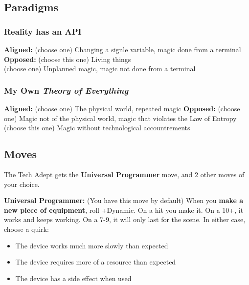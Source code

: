 \documentclass[
  oneside,
  statementpaper,
  9pt]{memoir}
\begin{document}
\hypertarget{paradigms-6}{%
\subsection{Paradigms}\label{paradigms-6}}

\hypertarget{reality-has-an-api}{%
\subsubsection{Reality has an API}\label{reality-has-an-api}}

\textbf{Aligned:} (choose one) Changing a signle variable, magic done
from a terminal\\
\textbf{Opposed:} (choose this one) Living things\\
(choose one) Unplanned magic, magic not done from a terminal

\hypertarget{my-own-theory-of-everything}{%
\subsubsection{\texorpdfstring{My Own \emph{Theory of
Everything}}{My Own Theory of Everything}}\label{my-own-theory-of-everything}}

\textbf{Aligned:} (choose one) The physical world, repeated magic
\textbf{Opposed:} (choose one) Magic not of the physical world, magic
that violates the Law of Entropy\\
(choose this one) Magic without technological accountrements

\hypertarget{moves-6}{%
\subsection{Moves}\label{moves-6}}

The Tech Adept gets the \textbf{Universal Programmer} move, and 2 other
moves of your choice.

\textbf{Universal Programmer:} (You have this move by default) When you
\textbf{make a new piece of equipment}, roll +Dynamic. On a hit you make
it. On a 10+, it works and keeps working. On a 7-9, it will only last
for the scene. In either case, choose a quirk:

\begin{itemize}
\tightlist
\item
  The device works much more slowly than expected
\item
  The device requires more of a resource than expected
\item
  The device has a side effect when used
\end{itemize}
\end{document}
